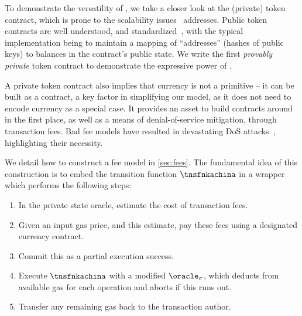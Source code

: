 To demonstrate the versatility of \kachina, we take a closer look at the
(private) token contract, which is prone to the scalability issues \kachina\
addresses. Public token contracts are well understood, and
standardized~\cite{erc20}, with the typical implementation being to maintain a
mapping of ``addresses'' (hashes of public keys) to balances in the contract's
public state. We write the first \emph{provably private} token contract to
demonstrate the expressive power of \kachina.

A private token contract also implies that currency is not a primitive -- it can
be built as a contract, a key factor in simplifying our model, as it does
not need to encode currency as a special case. It provides an asset to
build contracts around in the first place, as well as a means of
denial-of-service mitigation, through transaction fees. Bad fee models have
resulted in devastating DoS attacks~\cite{ethereumdos},
highlighting their necessity.

We detail how to construct a fee model in
  \iffull\autoref{sec:fees}\else\cite[Appendix~J.5]{fullversion}\fi. The
  fundamental idea of this construction is to embed the transition function
  $\tnsfnkachina$ in a wrapper which performs the following steps:

\begin{enumerate}
  \item In the private state oracle, estimate the cost of transaction
    fees.
  \item Given an input gas price, and this estimate, pay these fees using a
    designated currency contract.
  \item Commit this as a partial execution success.
  \item Execute $\tnsfnkachina$ with a modified $\oracle_\sigma$, which deducts
    from available gas for each operation and aborts if this runs out.
  \item Transfer any remaining gas back to the transaction author.
\end{enumerate}

